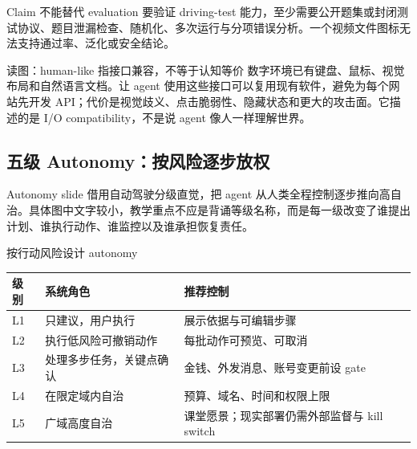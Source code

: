
\begin{warningbox}{Claim 不能替代 evaluation}
要验证 driving-test 能力，至少需要公开题集或封闭测试协议、题目泄漏检查、随机化、多次运行与分项错误分析。一个视频文件图标无法支持通过率、泛化或安全结论。
\end{warningbox}


\begin{knowledgebox}{读图：human-like 指接口兼容，不等于认知等价}
数字环境已有键盘、鼠标、视觉布局和自然语言文档。让 agent 使用这些接口可以复用现有软件，避免为每个网站先开发 API；代价是视觉歧义、点击脆弱性、隐藏状态和更大的攻击面。它描述的是 I/O compatibility，不是说 agent 像人一样理解世界。
\end{knowledgebox}

\subsection{五级 Autonomy：按风险逐步放权}

Autonomy slide 借用自动驾驶分级直觉，把 agent 从人类全程控制逐步推向高自治。具体图中文字较小，教学重点不应是背诵等级名称，而是每一级改变了谁提出计划、谁执行动作、谁监控以及谁承担恢复责任。


\begin{importantbox}{按行动风险设计 autonomy}
\begin{tabularx}{\textwidth}{L{0.10\textwidth}>{\raggedright\arraybackslash}X >{\raggedright\arraybackslash}X}
\toprule
级别 & 系统角色 & 推荐控制 \\
\midrule
L1 & 只建议，用户执行 & 展示依据与可编辑步骤 \\
L2 & 执行低风险可撤销动作 & 每批动作可预览、可取消 \\
L3 & 处理多步任务，关键点确认 & 金钱、外发消息、账号变更前设 gate \\
L4 & 在限定域内自治 & 预算、域名、时间和权限上限 \\
L5 & 广域高度自治 & 课堂愿景；现实部署仍需外部监督与 kill switch \\
\bottomrule
\end{tabularx}
\end{importantbox}

